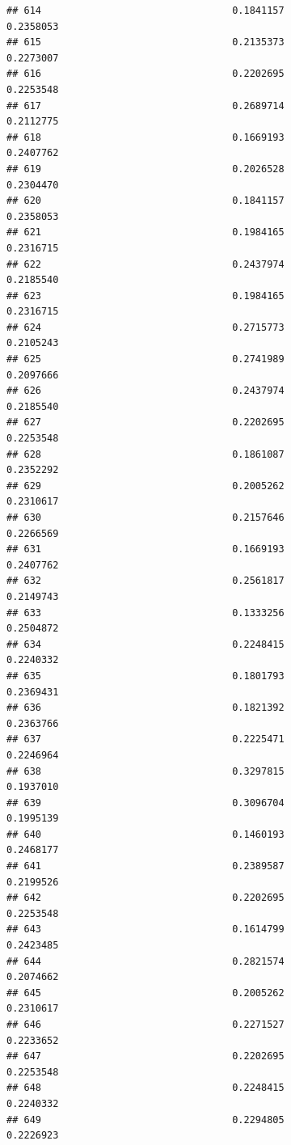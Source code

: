 \documentclass[
  american,
  man,floatsintext]{apa7}
\begin{document}
\begin{verbatim}
## 614                                 0.1841157               0.2358053
## 615                                 0.2135373               0.2273007
## 616                                 0.2202695               0.2253548
## 617                                 0.2689714               0.2112775
## 618                                 0.1669193               0.2407762
## 619                                 0.2026528               0.2304470
## 620                                 0.1841157               0.2358053
## 621                                 0.1984165               0.2316715
## 622                                 0.2437974               0.2185540
## 623                                 0.1984165               0.2316715
## 624                                 0.2715773               0.2105243
## 625                                 0.2741989               0.2097666
## 626                                 0.2437974               0.2185540
## 627                                 0.2202695               0.2253548
## 628                                 0.1861087               0.2352292
## 629                                 0.2005262               0.2310617
## 630                                 0.2157646               0.2266569
## 631                                 0.1669193               0.2407762
## 632                                 0.2561817               0.2149743
## 633                                 0.1333256               0.2504872
## 634                                 0.2248415               0.2240332
## 635                                 0.1801793               0.2369431
## 636                                 0.1821392               0.2363766
## 637                                 0.2225471               0.2246964
## 638                                 0.3297815               0.1937010
## 639                                 0.3096704               0.1995139
## 640                                 0.1460193               0.2468177
## 641                                 0.2389587               0.2199526
## 642                                 0.2202695               0.2253548
## 643                                 0.1614799               0.2423485
## 644                                 0.2821574               0.2074662
## 645                                 0.2005262               0.2310617
## 646                                 0.2271527               0.2233652
## 647                                 0.2202695               0.2253548
## 648                                 0.2248415               0.2240332
## 649                                 0.2294805               0.2226923

\end{verbatim}
\end{document}
